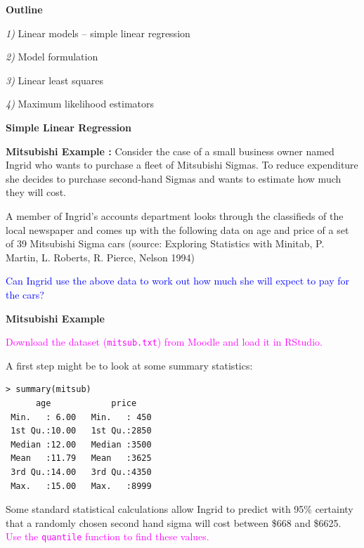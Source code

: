 \documentclass[landscape]{slides}
\newcommand{\heading}[1]{%
  \begin{center}
    \large\bf \color{red}
        #1
  \end{center}
  \vspace{1ex minus 1ex}}
\begin{document}
\begin{slide}
\heading{Outline}
\vskip 1.0cm
{\em 1)} Linear models -- simple linear regression

{\em 2)} Model formulation

{\em 3)} Linear least squares

{\em 4)} Maximum likelihood estimators
\end{slide}


\begin{slide}
\heading{Simple Linear Regression}
{\bf Mitsubishi Example :}
Consider the case of a small business owner named Ingrid who wants to
purchase a fleet of Mitsubishi Sigmas. To reduce expenditure she decides
to purchase second-hand Sigmas and wants to estimate how much they will cost.

A member of Ingrid's accounts department looks through the classifieds of
the local newspaper and comes up with the following data on age and price of
a set of 39 Mitsubishi Sigma cars (source: Exploring Statistics with Minitab,
P. Martin, L. Roberts, R. Pierce, Nelson 1994)


\textcolor{blue}{Can Ingrid use the above data to work out how much she will expect to pay
for the cars?}

\end{slide}
\begin{slide}
\heading{Mitsubishi Example}
%
\textcolor{magenta}{Download the dataset ({\tt mitsub.txt}) from Moodle and load it in RStudio.}

A first step might be to look at some summary statistics:
%
{\small
\begin{verbatim}
> summary(mitsub)
      age            price     
 Min.   : 6.00   Min.   : 450  
 1st Qu.:10.00   1st Qu.:2850  
 Median :12.00   Median :3500  
 Mean   :11.79   Mean   :3625  
 3rd Qu.:14.00   3rd Qu.:4350  
 Max.   :15.00   Max.   :8999  
\end{verbatim}
}

Some standard statistical calculations allow Ingrid to predict with 95\%
certainty that a randomly chosen second hand sigma will cost between
\$668 and \$6625. 
\textcolor{magenta}{Use the {\tt quantile} function to find these values.}
\end{slide}
\end{document}
